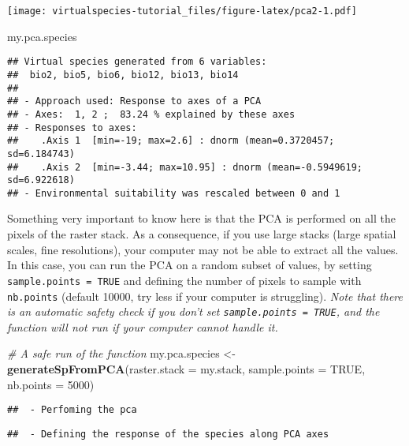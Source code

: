 \documentclass[]{article}
\newenvironment{Shaded}{\begin{snugshade}}{\end{snugshade}}
\newcommand{\KeywordTok}[1]{\textcolor[rgb]{0.13,0.29,0.53}{\textbf{#1}}}
\newcommand{\DataTypeTok}[1]{\textcolor[rgb]{0.13,0.29,0.53}{#1}}
\newcommand{\DecValTok}[1]{\textcolor[rgb]{0.00,0.00,0.81}{#1}}
\newcommand{\StringTok}[1]{\textcolor[rgb]{0.31,0.60,0.02}{#1}}
\newcommand{\CommentTok}[1]{\textcolor[rgb]{0.56,0.35,0.01}{\textit{#1}}}
\newcommand{\OtherTok}[1]{\textcolor[rgb]{0.56,0.35,0.01}{#1}}
\newcommand{\NormalTok}[1]{#1}
\begin{document}
\texttt{[image: virtualspecies-tutorial\_files/figure-latex/pca2-1.pdf]}

\begin{Shaded}
\begin{Highlighting}[]
\NormalTok{my.pca.species}
\end{Highlighting}
\end{Shaded}

\begin{verbatim}
## Virtual species generated from 6 variables:
##  bio2, bio5, bio6, bio12, bio13, bio14
## 
## - Approach used: Response to axes of a PCA
## - Axes:  1, 2 ;  83.24 % explained by these axes
## - Responses to axes:
##    .Axis 1  [min=-19; max=2.6] : dnorm (mean=0.3720457; sd=6.184743)
##    .Axis 2  [min=-3.44; max=10.95] : dnorm (mean=-0.5949619; sd=6.922618)
## - Environmental suitability was rescaled between 0 and 1
\end{verbatim}

Something very important to know here is that the PCA is performed on
all the pixels of the raster stack. As a consequence, if you use large
stacks (large spatial scales, fine resolutions), your computer may not
be able to extract all the values. In this case, you can run the PCA on
a random subset of values, by setting \texttt{sample.points\ =\ TRUE}
and defining the number of pixels to sample with \texttt{nb.points}
(default 10000, try less if your computer is struggling). \emph{Note
that there is an automatic safety check if you don't set
\texttt{sample.points\ =\ TRUE}, and the function will not run if your
computer cannot handle it.}

\begin{Shaded}
\begin{Highlighting}[]
\CommentTok{# A safe run of the function}
\NormalTok{my.pca.species <-}\StringTok{ }\KeywordTok{generateSpFromPCA}\NormalTok{(}\DataTypeTok{raster.stack =}\NormalTok{ my.stack, }
                                    \DataTypeTok{sample.points =} \OtherTok{TRUE}\NormalTok{, }\DataTypeTok{nb.points =} \DecValTok{5000}\NormalTok{)}
\end{Highlighting}
\end{Shaded}

\begin{verbatim}
##  - Perfoming the pca
\end{verbatim}

\begin{verbatim}
##  - Defining the response of the species along PCA axes
\end{verbatim}
\end{document}
